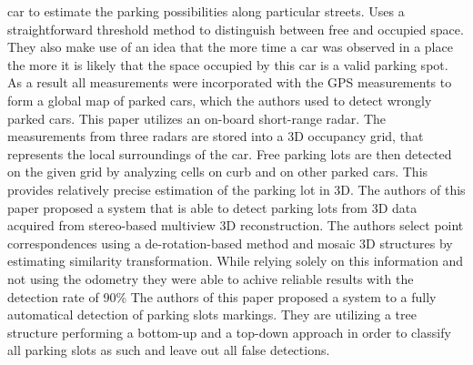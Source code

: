 car to estimate the parking possibilities along particular streets. Uses a
straightforward threshold method to distinguish between free and occupied space.
They also make use of an idea that the more time a car was observed in a place
the more it is likely that the space occupied by this car is a valid parking
spot. As a result all measurements were incorporated with the GPS measurements
to form a global map of parked cars, which the authors used to detect wrongly
parked cars. 
\newline
This paper \cite{schmid11} utilizes an on-board short-range radar. The
measurements from three radars are stored into a 3D occupancy grid, that
represents the local surroundings of the car. Free parking lots are then
detected on the given grid by analyzing cells on curb and on other parked cars.
This provides relatively precise estimation of the parking lot in 3D.
\newline
The authors of this paper \cite{suhr10} proposed a system that is able to detect
parking lots from 3D data acquired from stereo-based multiview 3D
reconstruction. The authors select point correspondences using a
de-rotation-based method and mosaic 3D structures by estimating similarity
transformation. While relying solely on this information and not using the
odometry they were able to achive reliable results with the detection rate of
90\%
\newline
The authors of this paper \cite{suhr13} proposed a system to a fully automatical
detection of parking slots markings. They are utilizing a tree structure
performing a bottom-up and a top-down approach in order to classify all parking
slots as such and leave out all false detections.
